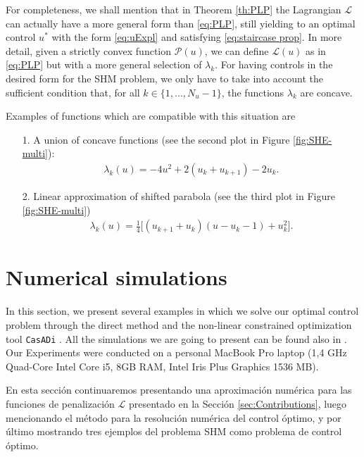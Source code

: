 \documentclass[twocolumn]{autart}    %
\begin{document}
\begin{remark}

For completeness, we shall mention that in Theorem \ref{th:PLP} the Lagrangian $\mathcal L$ can actually have a more general form than \eqref{eq:PLP}, still yielding to an optimal control $u^\ast$ with the form \eqref{eq:uExpl} and satisfying \eqref{eq:staircase prop}. In more detail, given a strictly convex function $\mathcal{P}(u)$, we can define $\mathcal{L}(u)$ as in \eqref{eq:PLP} but with a more general selection of  $\lambda_k$. For having controls in the desired form for the SHM problem, we only have to take into account the sufficient condition that, for all $k \in \{1,\dots,N_u-1\}$, the functions $\lambda_k$ are concave.

Examples of functions which are compatible with this situation are
\begin{enumerate}
    \item[1.] A union of concave functions (see the second plot in Figure \ref{fig:SHE-multi}):
    \begin{align*}
        \lambda_k(u) = -4u^2 + 2(u_k + u_{k+1}) - 2u_{k}.
    \end{align*}
    \item[2.] Linear approximation of shifted parabola (see the third plot in Figure \ref{fig:SHE-multi})
    \begin{align*}
        \lambda_k(u) = \frac 1 4\Big[(u_{k+1}+u_{k}) (u-u_k-1) + u_k^2\Big].
    \end{align*}
\end{enumerate}
\end{remark}
\section{Numerical simulations}\label{sec:Simulations}

In this section, we present several examples in which we solve our optimal control problem through the direct method \cite{rao2009survey} and the non-linear constrained optimization tool \texttt{CasADi} \cite{Andersson2019}. All the simulations we are going to present can be found also in \cite{simus}. Our Experiments were conducted on a personal MacBook Pro laptop (1,4 GHz Quad-Core Intel Core i5, 8GB RAM, Intel Iris Plus
Graphics 1536 MB). 

\JOStart
En esta sección continuaremos  presentando una aproximación numérica para las funciones de penalización $\mathcal{L}$ presentado en la Sección \ref{sec:Contributions}, luego mencionando el método para la resolución numérica del control óptimo, y por último mostrando tres ejemplos del problema SHM como problema de control óptimo.
\JOEnd
%
\end{document}
